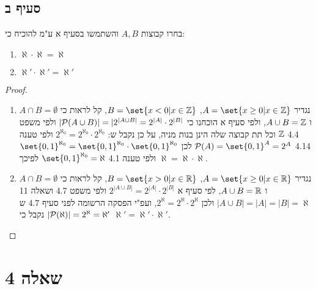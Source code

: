 \documentclass{article}
\DeclarePairedDelimiter\set\{\}
\begin{document}
	\pagebreak
	\subsection*{סעיף ב}
	בחרו קבוצות $A, B$ והשתמשו בסעיף א ע"מ להוכיח כי:
	\begin{enumerate}
		\item $\aleph \cdot \aleph = \aleph$
		\item $\aleph' \cdot \aleph' = \aleph'$
	\end{enumerate}
	\begin{proof} \leavevmode
		\begin{enumerate}
			\item נגדיר $A = \set{x \geq 0 | x \in \ZZ}$, $B = \set{x < 0 | x \in \ZZ}$, קל לראות כי $A \cap B = \emptyset$ ו $A \cup B = \mathbb{Z}$,
			ולפי סעיף א הוכחנו כי $|\mathcal{P}(A \cup B)| = |2^{|A \cup B|} = 2^{|A|} \cdot 2^{|B|}$  ולפי משפט 4.4 $\mathbb{Z}$ וכל תת קבוצה שלה הינן בנות מניה, על כן נקבל ש:
			$2^{\aleph_0} = 2^{\aleph_0} \cdot 2^{\aleph_0}$ ולפי טענה 4.14 $\PP(A) = \set{0,1}^A = 2^A$ לכן
			$\set{0,1}^{\aleph_0} = \set{0,1}^{\aleph_0} \cdot \set{0,1}^{\aleph_0}$
			ולפי טענה 4.1 $\set{0,1}^{\aleph_0} = \aleph$
			לפיכך $\aleph = \aleph \cdot \aleph$.

			\item נגדיר $A = \set{x \geq 0 | x \in \RR}$, $B = \set{x > 0 | x \in \RR}$, קל לראות כי $A \cap B = \emptyset$ ו $A \cup B = \mathbb{R}$,
			לפי סעיף א $2^{|A \cup B|} = 2^{|A|} \cdot 2^{|B|}$
			ולפי משפט 4.7 ושאלה 11 $|A \cup B| = |A| = |B| = \aleph$
			ולכן $2^\aleph = 2^\aleph \cdot 2^\aleph$, ועפ"י הפסקה הרשומה לפני סעיף 4.7 ש $|\mathcal{P}(\aleph)| = 2^{\aleph} = \aleph'$ נקבל כי $\aleph' = \aleph' \cdot \aleph'$.
		\end{enumerate}
	\end{proof}

	\pagebreak
	\section*{שאלה 4}
\end{document}
